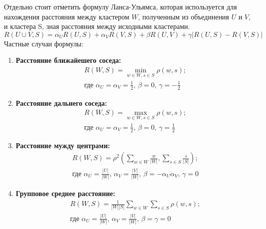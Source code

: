 \documentclass[a4paper]{article}
\begin{document}
\begin{itemize}
 Отдельно стоит отметить формулу Ланса-Ульямса, которая используется для нахождения расстояния между кластером $W$, полученным из объединения $U$ и $V$, и кластера S, зная расстояния между исходными кластерами. \\
 \begin{equation*}
 R(U \cup V, S) = \alpha_{U} R(U,S) + \alpha_{V} R(V,S) + \beta R(U,V) + \gamma |R(U,S) - R(V,S)|
 \end{equation*} 
 Частные случаи формулы:
 \begin{enumerate}
 	\item \textbf{Расстояние ближайешего соседа:}
 	\begin{gather*}
 	{R}(W, S) = \min_{w \in W, s \in S} \rho(w,s); \\
 	\text{где $\alpha_{U} = \alpha_{V} = \frac{1}{2}$, $\beta = 0$, $\gamma = -\frac{1}{2}$}
 	\end{gather*}
 	\item \textbf{Расстояние дальнего соседа:}
 	\begin{gather*}
 	{R}(W, S) = \max_{w \in W, s \in S} \rho(w,s); \\
 	\text{где $\alpha_{U} = \alpha_{V} = \frac{1}{2}$, $\beta = 0$, $\gamma = \frac{1}{2}$}
 	\end{gather*}
 	\item \textbf{Расстояние мужду центрами:}
 	\begin{gather*}
 	{R}(W, S) = \rho^2(\sum_{w \in W} \frac{w}{|W|}, \sum_{s \in S} \frac{s}{|S|}); \\
 	\text{где $\alpha_{U} = \frac{|U|}{|W|}$, $\alpha_{V} =\frac{|V|}{|W|}$, $\beta = -\alpha_{U} \alpha_{V}$, $\gamma = 0$}
 	\end{gather*}
 	\item \textbf{Групповое среднее расстояние:}
 	\begin{gather*}
 	{R}(W, S) = \frac{1}{|W||S|}\sum_{w \in W} \sum_{s \in S} \rho (w,s); \\
 	\text{где $\alpha_{U} = \frac{|U|}{|W|}$, $\alpha_{V} =\frac{|V|}{|W|}$, $\beta = \gamma = 0$}
 	\end{gather*}
 \end{enumerate}
 \end{itemize}


\newpage
\end{document}
